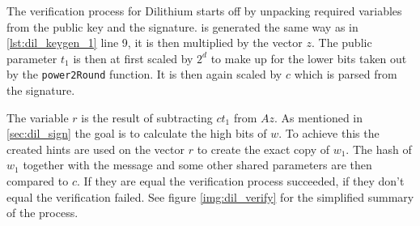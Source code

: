 The verification process for Dilithium starts off by unpacking required variables from the public key and the signature.  is generated the same way as in \ref{lst:dil_keygen_1} line 9, it is then multiplied by the vector $z$. The public parameter $t_1$ is then at first scaled by $2^d$ to make up for the lower bits taken out by the \texttt{power2Round} function. It is then again scaled by $c$ which is parsed from the signature.

The variable $r$ is the result of subtracting $ct_1$ from $Az$. As mentioned in \ref{sec:dil_sign} the goal is to calculate the high bits of $w$. To achieve this the created hints are used on the vector $r$ to create the exact copy of $w_1$. The hash of $w_1$ together with the message and some other shared parameters are then compared to $c$. If they are equal the verification process succeeded, if they don't equal the verification failed. See figure \ref{img:dil_verify} for the simplified summary of the process.
\newpage
{}

